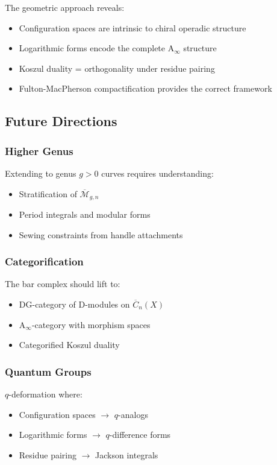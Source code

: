The geometric approach reveals:
\begin{itemize}
\item Configuration spaces are intrinsic to chiral operadic structure
\item Logarithmic forms encode the complete A$_\infty$ structure
\item Koszul duality = orthogonality under residue pairing
\item Fulton-MacPherson compactification provides the correct framework
\end{itemize}
 
\subsection{Future Directions}
 
\subsubsection{Higher Genus}
Extending to genus $g > 0$ curves requires understanding:
\begin{itemize}
\item Stratification of $\overline{\mathcal{M}}_{g,n}$
\item Period integrals and modular forms
\item Sewing constraints from handle attachments
\end{itemize}
 
\subsubsection{Categorification}
The bar complex should lift to:
\begin{itemize}
\item DG-category of D-modules on $\overline{C}_n(X)$
\item A$_\infty$-category with morphism spaces
\item Categorified Koszul duality
\end{itemize}
 
\subsubsection{Quantum Groups}
$q$-deformation where:
\begin{itemize}
\item Configuration spaces $\to$ $q$-analogs
\item Logarithmic forms $\to$ $q$-difference forms
\item Residue pairing $\to$ Jackson integrals
\end{itemize}
 
